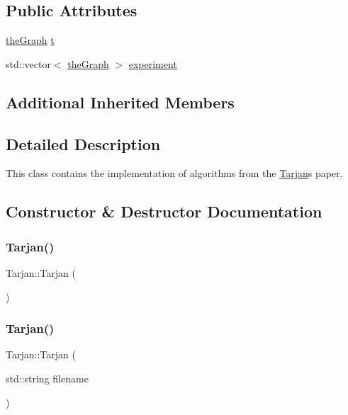 \subsection*{Public Attributes}
\begin{DoxyCompactItemize}
\item 
\hyperlink{class_graph_component_a982e0748a6e1b8dc74986f5f8b3dca5c}{the\+Graph} \hyperlink{class_tarjan_a54b0703f885a3514ea0bf4cdbc7fdaad}{t}
\item 
std\+::vector$<$ \hyperlink{class_graph_component_a982e0748a6e1b8dc74986f5f8b3dca5c}{the\+Graph} $>$ \hyperlink{class_tarjan_aaa327f105a07f07648dcc6f62a565986}{experiment}
\end{DoxyCompactItemize}
\subsection*{Additional Inherited Members}


\subsection{Detailed Description}
This class contains the implementation of algorithms from the \hyperlink{class_tarjan}{Tarjan}\textquotesingle{}s paper. 

\subsection{Constructor \& Destructor Documentation}
\mbox{\label{class_tarjan_a24a7fa59ed2fcff4a520e012e30acb91}} 
\subsubsection{\texorpdfstring{Tarjan()}{Tarjan()}\hspace{0.1cm}{\footnotesize\ttfamily [1/2]}}
{\footnotesize\ttfamily Tarjan\+::\+Tarjan (\begin{DoxyParamCaption}{ }\end{DoxyParamCaption})\hspace{0.3cm}{\ttfamily [inline]}}

\mbox{\label{class_tarjan_a7e9845c51e1e905df76b267370c6dc00}} 
\subsubsection{\texorpdfstring{Tarjan()}{Tarjan()}\hspace{0.1cm}{\footnotesize\ttfamily [2/2]}}
{\footnotesize\ttfamily Tarjan\+::\+Tarjan (\begin{DoxyParamCaption}\item[{std\+::string}]{filename }\end{DoxyParamCaption})\hspace{0.3cm}{\ttfamily [inline]}}



